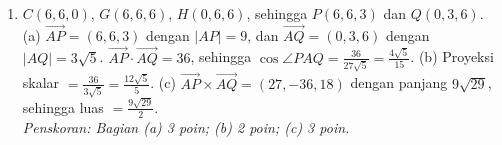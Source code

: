 \documentclass[a4paper,11pt]{article}
\newcommand{\dis}{\displaystyle}
\newcommand{\ov}[1]{\overrightarrow{#1}}
\begin{document}
\begin{enumerate}[leftmargin=2em,itemsep=3pt,topsep=2pt]
\item[\textbf{5.}] $C(6,6,0)$, $G(6,6,6)$, $H(0,6,6)$, sehingga $P(6,6,3)$ dan $Q(0,3,6)$. (a) $\ov{AP}=(6,6,3)$ dengan $|AP|=9$, dan $\ov{AQ}=(0,3,6)$ dengan $|AQ|=3\sqrt5$. $\ov{AP}\cdot\ov{AQ}=36$, sehingga $\cos\angle PAQ=\dis\frac{36}{27\sqrt5}=\dis\frac{4\sqrt5}{15}$. (b) Proyeksi skalar $=\dis\frac{36}{3\sqrt5}=\dis\frac{12\sqrt5}{5}$. (c) $\ov{AP}\times\ov{AQ}=(27,-36,18)$ dengan panjang $9\sqrt{29}$, sehingga luas $=\dis\frac{9\sqrt{29}}{2}$. \\ \textit{Penskoran: Bagian (a) 3 poin; (b) 2 poin; (c) 3 poin.}
\end{enumerate}
\end{document}
